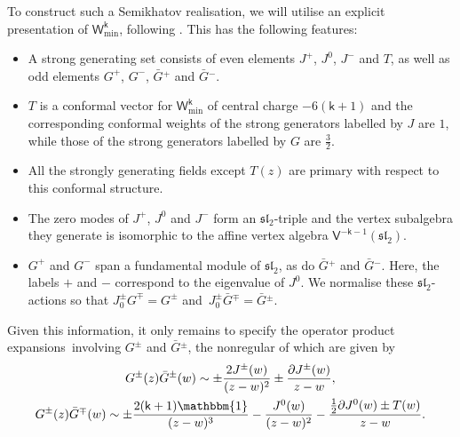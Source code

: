 \documentclass[10pt,a4paper]{amsart}
\numberwithin{equation}{section}
\newcommand{\pd}{\partial} %
\newcommand{\wun}{\mathbbm{1}} %
\newcommand{\bG}{\bar{G}{}}
\newcommand{\kk}{\mathsf{k}} %
\newcommand{\alg}[1]{\mathfrak{#1}} %
\newcommand{\VOA}[1]{\mathsf{#1}} %
\newcommand{\SLA}[2]{\alg{#1}_{#2}} %
\newcommand{\sltwo}{\SLA{sl}{2}}
\newcommand{\uaff}[2]{\VOA{V}^{#1}(#2)} %
\newcommand{\usl}[1][\kk]{\uaff{#1}{\sltwo}} %
\newcommand{\uwalg}[2]{\VOA{W}^{#1}_{\mathrm{#2}}} %
\newcommand{\umin}[1][\kk]{\uwalg{#1}{min}} %
\newcommand{\ope}{operator product expansion}
\newcommand{\opes}{\ope s}
\begin{document}
To construct such a Semikhatov realisation, we will utilise an explicit presentation of $\umin$, following \cite{KacQua03,KacQua03b}.
This has the following features:
\begin{itemize}\itemsep=0pt
	\item A strong generating set consists of even elements $J^+$, $J^0$, $J^-$ and $T$, as well as odd elements $G^+$, $G^-$, $\bG^+$ and $\bG^-$.
	\item $T$ is a conformal vector for $\umin$ of central charge $-6(\kk+1)$ and the corresponding conformal weights of the strong generators labelled by $J$ are $1$, while those of the strong generators labelled by $G$ are $\frac{3}{2}$.
	\item All the strongly generating fields except $T(z)$ are primary with respect to this conformal structure.
	\item The zero modes of $J^+$, $J^0$ and $J^-$ form an $\sltwo$-triple and the vertex subalgebra they generate is isomorphic to the affine vertex algebra $\usl[-\kk-1]$.
	\item $G^+$ and $G^-$ span a fundamental module of $\sltwo$, as do $\bG^+$ and $\bG^-$.
	Here, the labels $+$ and $-$ correspond to the eigenvalue of $J^0$.
	We normalise these $\sltwo$-actions so that $J^{\pm}_0 G^{\mp} = G^{\pm}$ and~${J^{\pm}_0 \bG^{\mp} = \bG^{\pm}}$.
\end{itemize}
Given this information, it only remains to specify the \opes\ involving $G^{\pm}$ and $\bG^{\pm}$, the nonregular of which are given by
\begin{gather*}
 G^{\pm} (z) \bG^{\pm} (w) \sim \pm \frac{2 J^{\pm} (w)}{(z-w)^2} \pm \frac{\pd J^{\pm} (w)}{z-w}, \\
 G^{\pm} (z) \bG^{\mp} (w) \sim \pm \frac{2(\kk+1) \wun}{(z-w)^3} - \frac{J^0 (w)}{(z-w)^2} - \frac{\frac{1}{2} \pd J^0(w) \pm T(w)}{z-w}.
\end{gather*}
\end{document}
